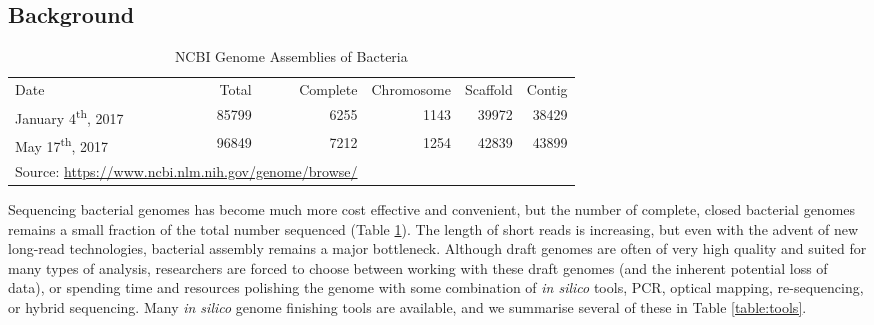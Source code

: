 \documentclass[10pt]{article}
\makeatletter
\newcommand{\ra}[1]{\renewcommand{\arraystretch}{#1}}
\newcommand{\cmidrules}[1]{%
  \noalign{%
    \global\MD@cmidrules={}%
    \toks@={\cmidrule(l{.3\tabcolsep}r{.3\tabcolsep})}%
    \count@=\z@
    \loop\ifnum\count@<#1\relax
      \advance\count@\@ne
      \edef\MD@temp{\the\toks@{\the\count@-\the\count@}}%
      \global\MD@cmidrules\expandafter{\the\expandafter\MD@cmidrules\MD@temp}%
    \repeat
  }%
  \the\MD@cmidrules
}
\makeatother
\begin{document}
\begin{linenumbers}


\section*{Background}

\begin{table}[!h]
  \centering
  \ra{1.3}
  \caption{NCBI Genome Assemblies of Bacteria}
  \label{table:completions}
  \begin{tabular}{lrrrrr}
    \toprule
    Date & Total & Complete & Chromosome & Scaffold & Contig \\
    \cmidrules{6}
    January 4\textsuperscript{th}, 2017 & 85799 & 6255 & 1143 & 39972 & 38429  \\
    May 17\textsuperscript{th}, 2017 & 96849 & 7212 & 1254 & 42839 & 43899\\
    \bottomrule
    \multicolumn{3}{l}{\tiny Source: \url{https://www.ncbi.nlm.nih.gov/genome/browse/}}
  \end{tabular}
\end{table}

Sequencing bacterial genomes has become much more cost effective and convenient, but the number of complete, closed bacterial genomes remains a small fraction of the total number sequenced (Table \ref{table:completions}). The length of short reads is increasing, but even with the advent of new long-read technologies, bacterial assembly remains a major bottleneck\cite{Nagarajan2010,Brouwer2016}. Although draft genomes are often of very high quality and suited for many types of analysis, researchers are forced to choose between working with these draft genomes (and the inherent potential loss of data), or spending time and resources polishing the genome with some combination of \textit{in silico} tools, PCR, optical mapping, re-sequencing, or hybrid sequencing\cite{Nagarajan2010,Utturkar2014}. Many \textit{in silico} genome finishing tools are available, and we summarise several of these in Table \ref{table:tools}.



\end{linenumbers}
\end{document}
